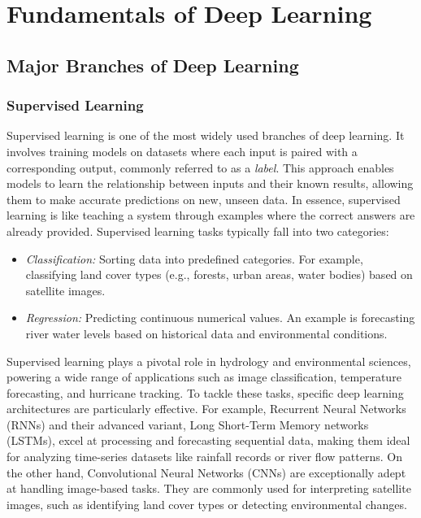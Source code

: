 \chapter{Fundamentals of Deep Learning}




\section{Major Branches of Deep Learning}


\subsection{Supervised Learning}

Supervised learning is one of the most widely used branches of deep learning. It involves training models on datasets where each input is paired with a corresponding output, commonly referred to as a \textit{label}. This approach enables models to learn the relationship between inputs and their known results, allowing them to make accurate predictions on new, unseen data. In essence, supervised learning is like teaching a system through examples where the correct answers are already provided.
Supervised learning tasks typically fall into two categories:
\begin{itemize}
\item \textit{Classification:} Sorting data into predefined categories. For example, classifying land cover types (e.g., forests, urban areas, water bodies) based on satellite images.
\item \textit{Regression:} Predicting continuous numerical values. An example is forecasting river water levels based on historical data and environmental conditions.
\end{itemize}
Supervised learning plays a pivotal role in hydrology and environmental sciences, powering a wide range of applications such as image classification, temperature forecasting, and hurricane tracking. To tackle these tasks, specific deep learning architectures are particularly effective. For example, Recurrent Neural Networks (RNNs) and their advanced variant, Long Short-Term Memory networks (LSTMs), excel at processing and forecasting sequential data, making them ideal for analyzing time-series datasets like rainfall records or river flow patterns. On the other hand, Convolutional Neural Networks (CNNs) are exceptionally adept at handling image-based tasks. They are commonly used for interpreting satellite images, such as identifying land cover types or detecting environmental changes.
